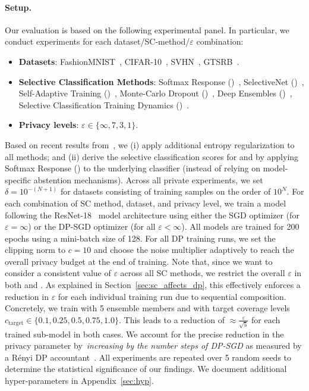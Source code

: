 \paragraph{Setup.} Our evaluation is based on the following experimental panel. In particular, we conduct experiments for each dataset/SC-method/$\varepsilon$ combination:
\begin{itemize}
    \item \textbf{Datasets}: FashionMNIST~\citep{xiao2017fashion}, CIFAR-10~\citep{krizhevsky2009learning}, SVHN~\citep{netzer2011reading}, GTSRB~\citep{Houben-IJCNN-2013}.
    \item \textbf{Selective Classification Methods}: Softmax Response (\sr)~\citep{geifman2017selective}, SelectiveNet (\sn)~\citep{geifman2019selectivenet}, Self-Adaptive Training (\sat)~\citep{huang2020self}, Monte-Carlo Dropout (\mcdo)~\citep{gal2016dropout}, Deep Ensembles (\de)~\citep{lakshminarayanan2017simple}, Selective Classification Training Dynamics (\sctd)~\citep{rabanser2022selective}.
    \item \textbf{Privacy levels}: $\varepsilon \in \{\infty, 7, 3, 1\}$.
\end{itemize}

Based on recent results from~\citet{feng2023towards}, we (i) apply additional entropy regularization to all methods; and (ii) derive the selective classification scores for \sn and \sat by applying Softmax Response (\sr) to the underlying classifier (instead of relying on model-specific abstention mechanisms). Across all private experiments, we set $\delta = 10^{-(N+1)}$ for datasets consisting of training samples on the order of $10^N$. For each combination of SC method, dataset, and privacy level, we train a model following the ResNet-18~\citep{he2016deep} model architecture using either the SGD optimizer (for $\varepsilon=\infty$) or the DP-SGD optimizer (for all $\varepsilon<\infty$). All models are trained for 200 epochs using a mini-batch size of 128. For all DP training runs, we set the clipping norm to $c=10$ and choose the noise multiplier adaptively to reach the overall privacy budget at the end of training. Note that, since we want to consider a consistent value of $\varepsilon$ across all SC methods, we restrict the overall $\varepsilon$ in both \sn and \de. As explained in Section~\ref{sec:sc_affects_dp}, this effectively enforces a reduction in $\varepsilon$ for each individual training run due to sequential composition. Concretely, we train \de with 5 ensemble members and \sn with target coverage levels $c_\text{target} \in \{0.1,0.25,0.5,0.75,1.0\}$. This leads to a reduction of $\approx\frac{\varepsilon}{\sqrt 5}$ for each trained sub-model in both cases. We account for the precise reduction in the privacy parameter by~\emph{increasing by the number steps of DP-SGD} as measured by a R\'enyi DP accountant~\citep{mironov2017renyi,opacus}. All experiments are repeated over 5 random seeds to determine the statistical significance of our findings. We document additional hyper-parameters in Appendix~\ref{sec:hyp}.

